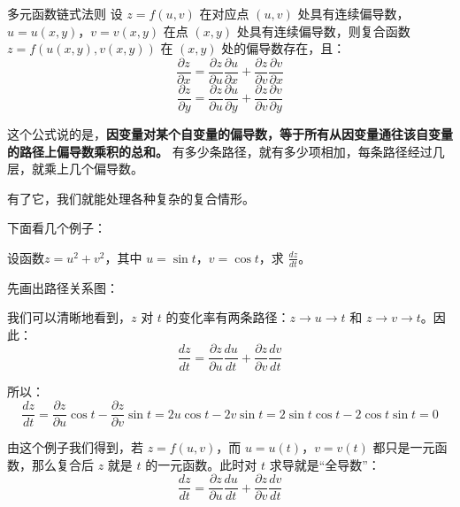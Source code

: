 \begin{theorem}{多元函数链式法则}{}
设 $z = f(u,v)$ 在对应点 $(u,v)$ 处具有连续偏导数，$u = u(x,y)$，$v = v(x,y)$ 在点 $(x,y)$ 处具有连续偏导数，则复合函数 $z = f(u(x,y), v(x,y))$ 在 $(x,y)$ 处的偏导数存在，且：
\[
\frac{\partial z}{\partial x} = \frac{\partial z}{\partial u}\frac{\partial u}{\partial x} + \frac{\partial z}{\partial v}\frac{\partial v}{\partial x}
\]
\[
\frac{\partial z}{\partial y} = \frac{\partial z}{\partial u}\frac{\partial u}{\partial y} + \frac{\partial z}{\partial v}\frac{\partial v}{\partial y}
\]
\end{theorem}

这个公式说的是，\textbf{因变量对某个自变量的偏导数，等于所有从因变量通往该自变量的路径上偏导数乘积的总和。} 有多少条路径，就有多少项相加，每条路径经过几层，就乘上几个偏导数。

有了它，我们就能处理各种复杂的复合情形。

下面看几个例子：

\begin{myexample}
  设函数$z=u^2+v^2$，其中 $u = \sin t$，$v = \cos t$，求 $\frac{dz}{dt}$。

  先画出路径关系图：

\begin{center}
\end{center}

我们可以清晰地看到，$z$ 对 $t$ 的变化率有两条路径：$z \to u \to t$ 和 $z \to v \to t$。因此：
\[
\frac{dz}{dt} = \frac{\partial z}{\partial u}\frac{du}{dt} + \frac{\partial z}{\partial v}\frac{dv}{dt}
\]

所以：
\[
\frac{dz}{dt} = \frac{\partial z}{\partial u}\cos t - \frac{\partial z}{\partial v}\sin t
=2u\cos t-2v\sin t=2\sin t \cos t-2\cos t \sin t=0
\]
\end{myexample}

由这个例子我们得到，若 $z = f(u,v)$，而 $u = u(t)$，$v = v(t)$ 都只是一元函数，那么复合后 $z$ 就是 $t$ 的一元函数。此时对 $t$ 求导就是“全导数”：
\[
\frac{dz}{dt} = \frac{\partial z}{\partial u}\frac{du}{dt} + \frac{\partial z}{\partial v}\frac{dv}{dt}
\]

